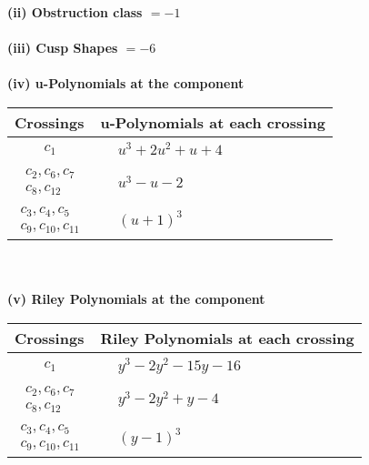 \documentclass[1p]{elsarticle_modified}
\theoremstyle{definition}
\begin{document}
\flushleft \textbf{(ii) Obstruction class $= -1$}\\~\\
\flushleft \textbf{(iii) Cusp Shapes $= -6$}\\~\\
\newpage\renewcommand{\arraystretch}{1}
\flushleft \textbf{(iv) u-Polynomials at the component}\newline \\
\begin{tabular}{m{50pt}|m{274pt}}
Crossings & \hspace{64pt}u-Polynomials at each crossing \\
\hline $$\begin{aligned}c_{1}\end{aligned}$$&$\begin{aligned}
&u^3+2 u^2+u+4
\end{aligned}$\\
\hline $$\begin{aligned}c_{2},c_{6},c_{7}\\c_{8},c_{12}\end{aligned}$$&$\begin{aligned}
&u^3- u-2
\end{aligned}$\\
\hline $$\begin{aligned}c_{3},c_{4},c_{5}\\c_{9},c_{10},c_{11}\end{aligned}$$&$\begin{aligned}
&(u+1)^3
\end{aligned}$\\
\hline
\end{tabular}\\~\\
\newpage\renewcommand{\arraystretch}{1}
\flushleft \textbf{(v) Riley Polynomials at the component}\newline \\
\begin{tabular}{m{50pt}|m{274pt}}
Crossings & \hspace{64pt}Riley Polynomials at each crossing \\
\hline $$\begin{aligned}c_{1}\end{aligned}$$&$\begin{aligned}
&y^3-2 y^2-15 y-16
\end{aligned}$\\
\hline $$\begin{aligned}c_{2},c_{6},c_{7}\\c_{8},c_{12}\end{aligned}$$&$\begin{aligned}
&y^3-2 y^2+y-4
\end{aligned}$\\
\hline $$\begin{aligned}c_{3},c_{4},c_{5}\\c_{9},c_{10},c_{11}\end{aligned}$$&$\begin{aligned}
&(y-1)^3
\end{aligned}$\\
\hline
\end{tabular}\\~\\
\end{document}

